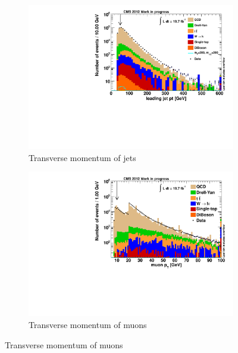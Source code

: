 \begin{figure}[b!]
  \ContinuedFloat
  \centering
  \begin{subfigure}[b]{0.495\textwidth}
    \centering
    \includegraphics[width=\textwidth]{plots/nTL_jetpt.pdf}
    \caption{Transverse momentum of jets\label{fig:ntljetpt}}
  \end{subfigure}
  \begin{subfigure}[b]{0.495\textwidth}
    \centering
    \includegraphics[width=\textwidth]{plots/nTL_mupt.pdf}
    \caption{Transverse momentum of muons \label{fig:ntlmupt}}
  \end{subfigure}
\end{figure}

